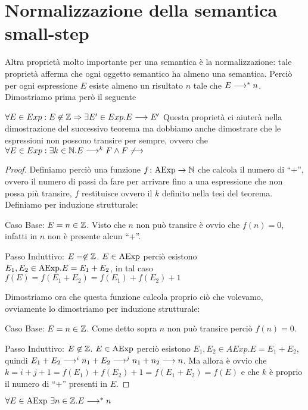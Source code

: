 \section{Normalizzazione della semantica small-step}
Altra proprietà molto importante per una semantica è la normalizzazione: tale proprietà afferma che
ogni oggetto semantico ha almeno una semantica. Perciò per ogni espressione $E$
esiste almeno un risultato $n$ tale che $E \longrightarrow ^* n$.
Dimostriamo prima però il seguente

\begin{teorema}
$\forall E \in Exp \mathrel{:} E \not \in \mathbb{Z} \Rightarrow \exists E' \in Exp . E \longrightarrow E'$
Questa proprietà ci aiuterà nella dimostrazione del successivo teorema ma dobbiamo anche dimostrare che le espressioni non possono transire per sempre, ovvero che $\forall E \in Exp \mathrel{:} \exists k \in \mathbb{N} . E \longrightarrow ^k F \land F \not \longrightarrow$
\end{teorema}

\begin{proof}
Definiamo perciò una funzione $\mathord{f}\colon\mathrm{AExp}\to\mathbb{N}$ che calcola il numero di ``+'', ovvero il numero di passi da fare per arrivare fino a una espressione che non possa più transire, $f$ restituisce ovvero il $k$ definito nella tesi del teorema. Definiamo per induzione strutturale:

Caso Base: $E = n \in \mathbb{Z}$.
Visto che $n$ non può transire è ovvio che $f(n) = 0$, infatti in $n$ non è presente alcun ``+''.

Passo Induttivo: $E = \not \in \mathbb{Z}$.
$E \in \mathrm{AExp}$ perciò esistono $E_1, E_2 \in \mathrm{AExp} . E = E_1 + E_2$, in tal caso $f(E) = f(E_1 + E_2) = f(E_1) + f(E_2) + 1$

Dimostriamo ora che questa funzione calcola proprio ciò che volevamo, ovviamente lo dimostriamo per induzione strutturale:

Caso Base: $E = n \in \mathbb{Z}$.
Come detto sopra $n$ non può transire perciò $f(n) = 0$.

Passo Induttivo: $E \not \in \mathbb{Z}$.
$E \in \mathrm{AExp}$ perciò esistono $E_1, E_2 \in AExp . E = E_1 + E_2$, quindi $E_1 + E_2 \longrightarrow ^i n_1 + E_2 \longrightarrow ^j n_1 + n_2 \longrightarrow n$. Ma allora è ovvio che $k = i + j + 1 = f(E_1) + f(E_2) + 1 = f(E_1 + E_2) = f(E)$ e che $k$ è proprio il numero di ``+'' presenti in $E$.
\end{proof}

\begin{teorema}[Normalizzazione]
  $\forall E \in \mathrm{AExp}\ \exists n \in \mathbb{Z} . E \longrightarrow ^* n$
\end{teorema}

